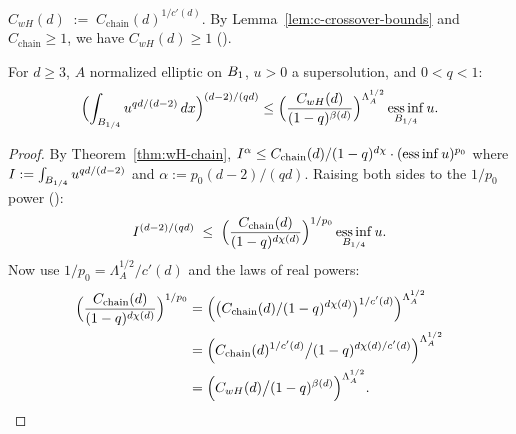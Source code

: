 \begin{definition}
\label{def:CwH}
\leanok
{}
$
  C_{wH}(d) \;:=\; C_{\mathrm{chain}}(d)^{1/c'(d)}.
$
By Lemma~\ref{lem:c-crossover-bounds} and $C_{\mathrm{chain}} \geq 1$, we have
$C_{wH}(d) \geq 1$ ().
\end{definition}

\begin{theorem}
\label{thm:wH}
\leanok
{}
For $d \geq 3$, $A$ normalized elliptic on $B_{1}$, $u > 0$ a supersolution,
and $0 < q < 1$:
\begin{equation*}
  \Bigl(\int_{B_{1/4}} u^{q d/(d-2)}\,dx\Bigr)^{(d-2)/(qd)}
    \leq \Bigl(\frac{C_{wH}(d)}{(1-q)^{\beta(d)}}\Bigr)^{\Lambda_A^{1/2}}
        \operatorname*{ess\,inf}_{B_{1/4}} u.
\end{equation*}
\end{theorem}

\begin{proof}
\leanok
{}

By Theorem~\ref{thm:wH-chain},
$I^\alpha \leq C_{\mathrm{chain}}(d)/(1-q)^{d\chi}\cdot (\operatorname*{ess\,inf} u)^{p_0}$
where $I := \int_{B_{1/4}} u^{qd/(d-2)}$ and $\alpha := p_0(d-2)/(qd)$.
Raising both sides to the $1/p_0$ power ():
\begin{equation*}
  I^{(d-2)/(qd)}
   \;\leq\; \Bigl(\frac{C_{\mathrm{chain}}(d)}{(1-q)^{d\chi(d)}}\Bigr)^{1/p_0}
       \operatorname*{ess\,inf}_{B_{1/4}} u.
\end{equation*}
Now use $1/p_0 = \Lambda_A^{1/2}/c'(d)$ and the laws of real powers:
\begin{align*}
  \Bigl(\frac{C_{\mathrm{chain}}(d)}{(1-q)^{d\chi(d)}}\Bigr)^{1/p_0}
   &= \Bigl(\bigl(C_{\mathrm{chain}}(d)/(1-q)^{d\chi(d)}\bigr)^{1/c'(d)}\Bigr)^{\Lambda_A^{1/2}}\\
   &= \Bigl(C_{\mathrm{chain}}(d)^{1/c'(d)}\big/(1-q)^{d\chi(d)/c'(d)}\Bigr)^{\Lambda_A^{1/2}}\\
   &= \Bigl(C_{wH}(d)\big/(1-q)^{\beta(d)}\Bigr)^{\Lambda_A^{1/2}}.
\end{align*}
\end{proof}

